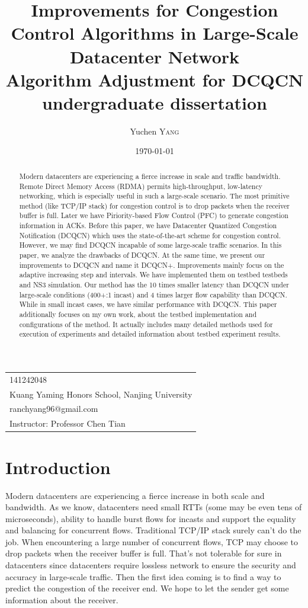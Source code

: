 \documentclass[12pt,a4paper]{article}
\title{Improvements for Congestion Control Algorithms in Large-Scale Datacenter Network \\ Algorithm Adjustment for DCQCN \\ undergraduate dissertation} %
\author{Yuchen \textsc{Yang}} %
\date{\today} %
\begin{document}
\maketitle %

\begin{center}
\begin{tabular}{l}
141242048 \\
Kuang Yaming Honors School, Nanjing University \\
ranchyang96@gmail.com \\
Instructor: Professor Chen Tian
\end{tabular}
\end{center}


\begin{abstract}
	Modern datacenters are experiencing a fierce increase in scale and traffic bandwidth.
	Remote Direct Memory Access (RDMA) permits high-throughput, low-latency networking,
	which is especially useful in such a large-scale scenario.
	The most primitive method (like TCP/IP stack) for congestion control is to drop packets when the receiver buffer is full.
	Later we have Piriority-based Flow Control (PFC) to generate congestion information in ACKs.
	Before this paper, we have Datacenter Quantized Congestion Notification (DCQCN) which uses the state-of-the-art scheme for congestion control.
	However, we may find DCQCN incapable of some large-scale traffic scenarios.
	In this paper, we analyze the drawbacks of DCQCN.
	At the same time, we present our improvements to DCQCN and name it DCQCN+.
	Improvements mainly focus on the adaptive increasing step and intervals.
	We have implemented them on testbed testbeds and NS3 simulation.
	Our method has the 10 times smaller latency than DCQCN under large-scale conditions (400+:1 incast) and 4 times larger flow capability than DCQCN.
	While in small incast cases, we have similar performance with DCQCN.
	This paper additionally focuses on my own work, about the testbed implementation and configurations of the method.
	It actually includes many detailed methods used for execution of experiments and detailed information about testbed experiment results.
\end{abstract}


\section{Introduction}

Modern datacenters are experiencing a fierce increase in both scale and bandwidth.
As we know, datacenters need small RTTs (some may be even tens of microseconds),
ability to handle burst flows for incasts and support the equality and balancing for concurrent flows.
Traditional TCP/IP stack surely can't do the job.
When encountering a large number of concurrent flows, TCP may choose to drop packets when the receiver buffer is full.
That's not tolerable for sure in datacenters since datacenters require lossless network to ensure the security and accuracy in large-scale traffic.
Then the first idea coming is to find a way to predict the congestion of the receiver end.
We hope to let the sender get some information about the receiver.
\end{document}
